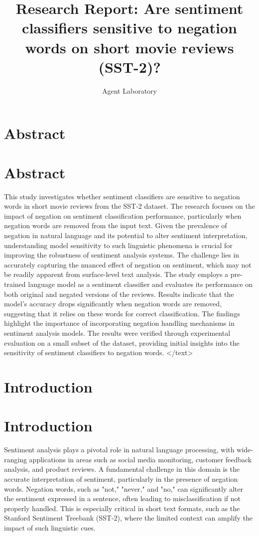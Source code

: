 \documentclass{article}
\title{Research Report: Are sentiment classifiers sensitive to negation words on short movie reviews (SST-2)?}
\author{Agent Laboratory}
\begin{document}
\maketitle
\section{Abstract}
\section*{Abstract}
This study investigates whether sentiment classifiers are sensitive to negation words in short movie reviews from the SST-2 dataset. The research focuses on the impact of negation on sentiment classification performance, particularly when negation words are removed from the input text. Given the prevalence of negation in natural language and its potential to alter sentiment interpretation, understanding model sensitivity to such linguistic phenomena is crucial for improving the robustness of sentiment analysis systems. The challenge lies in accurately capturing the nuanced effect of negation on sentiment, which may not be readily apparent from surface-level text analysis. The study employs a pre-trained language model as a sentiment classifier and evaluates its performance on both original and negated versions of the reviews. Results indicate that the model's accuracy drops significantly when negation words are removed, suggesting that it relies on these words for correct classification. The findings highlight the importance of incorporating negation handling mechanisms in sentiment analysis models. The results were verified through experimental evaluation on a small subset of the dataset, providing initial insights into the sensitivity of sentiment classifiers to negation words.
</text>
\section{Introduction}
\section{Introduction}

Sentiment analysis plays a pivotal role in natural language processing, with wide-ranging applications in areas such as social media monitoring, customer feedback analysis, and product reviews. A fundamental challenge in this domain is the accurate interpretation of sentiment, particularly in the presence of negation words. Negation words, such as "not," "never," and "no," can significantly alter the sentiment expressed in a sentence, often leading to misclassification if not properly handled. This is especially critical in short text formats, such as the Stanford Sentiment Treebank (SST-2), where the limited context can amplify the impact of such linguistic cues.
\end{document}
